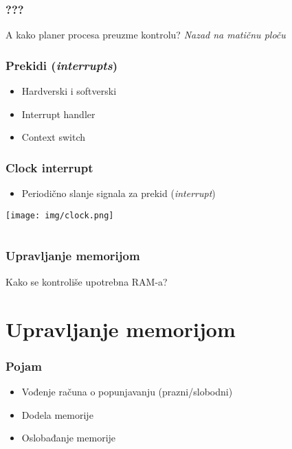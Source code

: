 \documentclass{beamer}
\begin{document}
\begin{frame}
    \frametitle{???}
    \begin{center}
        \LARGE{A kako planer procesa preuzme kontrolu?} \newline
        \newline
        \large{\textit{Nazad na matičnu ploču}}
    \end{center}
\end{frame}

\begin{frame}
    \frametitle{Prekidi (\textit{interrupts})}
    \begin{itemize}
        \item Hardverski i softverski \newline
        \item Interrupt handler \newline
        \item Context switch \newline
    \end{itemize}
\end{frame}

\begin{frame}
    \frametitle{Clock interrupt}
    \begin{itemize}
        \item Periodično slanje signala za prekid (\textit{interrupt}) \newline
    \end{itemize}
    \begin{center}
        \texttt{[image: img/clock.png]}
    \end{center}
\end{frame}

\section*{}
\subsection*{}
\begin{frame}
    \frametitle{Upravljanje memorijom}
    \begin{center}
        \LARGE{Kako se kontroliše upotrebna RAM-a?}
    \end{center}
\end{frame}

\section*{Upravljanje memorijom}
\begin{frame}
    \frametitle{Pojam}
    \begin{itemize}
        \item Vođenje računa o popunjavanju (prazni/slobodni) \newline
        \item Dodela memorije \newline
        \item Oslobađanje memorije
    \end{itemize}
\end{frame}
\end{document}
